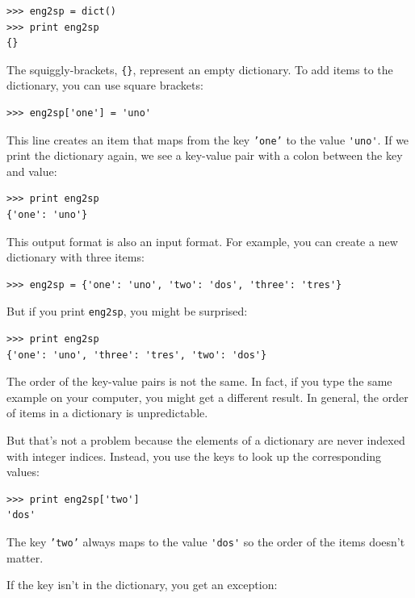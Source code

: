 \documentclass[10pt]{book}
\begin{document}

\beforeverb
\begin{verbatim}
>>> eng2sp = dict()
>>> print eng2sp
{}
\end{verbatim}
\afterverb

The squiggly-brackets, \verb"{}", represent an empty dictionary.
To add items to the dictionary, you can use square brackets:


\beforeverb
\begin{verbatim}
>>> eng2sp['one'] = 'uno'
\end{verbatim}
\afterverb
%
This line creates an item that maps from the key
{\tt 'one'} to the value \verb"'uno'".  If we print the
dictionary again, we see a key-value pair with a colon
between the key and value:

\beforeverb
\begin{verbatim}
>>> print eng2sp
{'one': 'uno'}
\end{verbatim}
\afterverb
%
This output format is also an input format.  For example,
you can create a new dictionary with three items:

\beforeverb
\begin{verbatim}
>>> eng2sp = {'one': 'uno', 'two': 'dos', 'three': 'tres'}
\end{verbatim}
\afterverb
%
But if you print {\tt eng2sp}, you might be surprised:

\beforeverb
\begin{verbatim}
>>> print eng2sp
{'one': 'uno', 'three': 'tres', 'two': 'dos'}
\end{verbatim}
\afterverb
%
The order of the key-value pairs is not the same.  In fact, if
you type the same example on your computer, you might get a
different result.  In general, the order of items in
a dictionary is unpredictable.

But that's not a problem because
the elements of a dictionary are never indexed with integer indices.
Instead, you use the keys to look up the corresponding values:

\beforeverb
\begin{verbatim}
>>> print eng2sp['two']
'dos'
\end{verbatim}
\afterverb
%
The key {\tt 'two'} always maps to the value \verb"'dos'" so the order
of the items doesn't matter.

If the key isn't in the dictionary, you get an exception:
\end{document}

